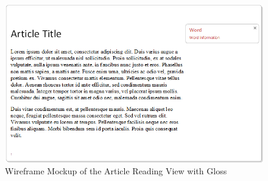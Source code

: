 \begin{figure}
	\caption{Wireframe Mockup of the Article Reading View with Gloss}
	\label{fig:view4}
	\includegraphics[width=\textwidth]{Graphics/View4}
\end{figure}